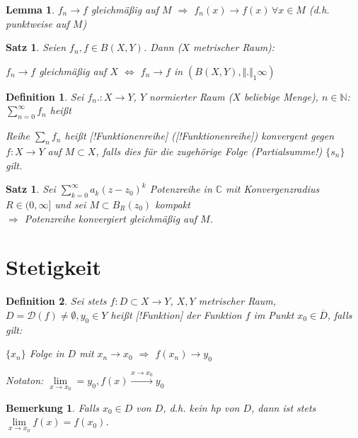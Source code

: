 \documentclass[ngerman,a4paper]{report}
\theoremstyle{break}
\newtheorem{lemma}[theorem]{Lemma}
\newtheorem{satz}[theorem]{Satz}
\newtheorem*{definition}{Definition}
\newtheorem{remark}[theorem]{Bemerkung}
\begin{document}
\begin{lemma}
	$f_n\to f$ gleichmäßig auf $M$ $\Rightarrow$ $f_n(x)\to f(x)\,\forall x\in M$ (d.h. punktweise auf $M$)
\end{lemma}

\begin{satz}
	Seien $f_n, f\in B(X,Y)$. Dann ($X$ metrischer Raum):
	\begin{center}
		$f_n \to f$ gleichmäßig auf $X$ $\Leftrightarrow$ $f_n \to f$ in $(B(X,Y),\Vert.\Vert_1\infty)$
	\end{center}
\end{satz}

\begin{definition}
	Sei $f_n.:X\to Y$, $Y$ normierter Raum ($X$ beliebige Menge), $n\in\mathbb{N}$: $\sum_{n=0}^\infty f_n$ heißt 
	
	Reihe $\sum_n f_n$ heißt [!Funktionenreihe] ([!Funktionenreihe]) konvergent gegen $f:X\to Y$ auf $M\subset X$, falls dies für die zugehörige Folge (Partialsumme!) $\{s_n\}$ gilt.
\end{definition}

\begin{satz}
	Sei $\sum_{k=0}^\infty a_k(z-z_0)^k$ Potenzreihe in $\mathbb{C}$ mit Konvergenzradius $R\in(0,\infty]$ und sei $M\subset B_R(z_0)$ kompakt\\
	$\Rightarrow$ Potenzreihe konvergiert gleichmäßig auf $M$.
\end{satz}

\section{Stetigkeit}
\begin{definition}
	Sei stets $f:D\subset X\rightarrow Y$, $X,Y$ metrischer Raum, $D=\mathcal{D}(f)\neq \emptyset, y_0\in Y$ heißt [!Funktion] der Funktion $f$ im Punkt $x_0\in \overline{D}$, falls gilt:
	\begin{center}
		$\{x_n\}$ Folge in $D$ mit $x_n\to x_0$ $\Rightarrow$ $f(x_n)\to y_0$
	\end{center}
	Notaton: $\lim\limits_{x\rightarrow x_0} = y_0, f(x)\overset{x\to x_0}{\longrightarrow } y_0$
\end{definition}
\begin{remark}
	Falls $x_0\in D$  von $D$, d.h. kein \gls{hp} von $D$, dann ist stets $\lim\limits_{x\rightarrow x_0} f(x) = f(x_0)$.
\end{remark}
\end{document}
